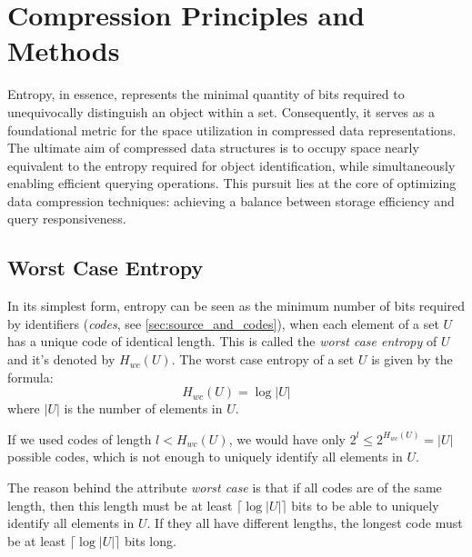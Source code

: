 
\chapter{Compression Principles and Methods}

\label{ch:Chapter2} %

Entropy, in essence, represents the minimal quantity of bits required to unequivocally distinguish an object within a set. Consequently, it serves as a foundational metric for the space utilization in compressed data representations. The ultimate aim of compressed data structures is to occupy space nearly equivalent to the entropy required for object identification, while simultaneously enabling efficient querying operations. This pursuit lies at the core of optimizing data compression techniques: achieving a balance between storage efficiency and query responsiveness.

\section*{Worst Case Entropy}
In its simplest form, entropy can be seen as the minimum number of bits required by identifiers (\emph{codes}, see \autoref{sec:source_and_codes}), when each element of a set $U$ has a unique code of identical length. This is called the \emph{worst case entropy} of $U$ and it's denoted by $H_{wc}(U)$. The worst case entropy of a set $U$ is given by the formula:
\begin{equation}
    H_{wc}(U) =  \log |U|
\end{equation}
where $|U|$ is the number of elements in $U$.

\begin{remark}
    If we used codes of length $l < H_{wc} (U)$, we would have only $2^l \leq 2^{H_{wc}(U)} = |U|$ possible codes, which is not enough to uniquely identify all elements in $U$.
\end{remark}

\noindent The reason behind the attribute \emph{worst case} is that if all codes are of the same length, then this length must be at least $\lceil \log |U| \rceil$ bits to be able to uniquely identify all elements in $U$. If they all have different lengths, the longest code must be at least $\lceil \log |U| \rceil$ bits long.


